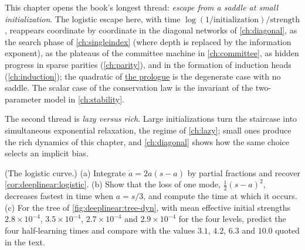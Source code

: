 \begin{refsection}

This chapter opens the book's longest thread: \emph{escape from a saddle at small initialization}. The logistic escape here, with time $\log(1/\text{initialization})/\text{strength}$, reappears coordinate by coordinate in the diagonal networks of \cref{ch:diagonal}, as the search phase of \cref{ch:singleindex} (where depth is replaced by the information exponent), as the plateaus of the committee machine in \cref{ch:committee}, as hidden progress in sparse parities (\cref{ch:parity}), and in the formation of induction heads (\cref{ch:induction}); the quadratic of \hyperref[ch:prologue]{the prologue} is the degenerate case with no saddle. The scalar case of the conservation law is the invariant of the two-parameter model in \cref{ch:stability}.

The second thread is \emph{lazy versus rich}. Large initializations turn the staircase into simultaneous exponential relaxation, the regime of \cref{ch:lazy}; small ones produce the rich dynamics of this chapter, and \cref{ch:diagonal} shows how the same choice selects an implicit bias.

\begin{exercises}
\item \consolidation (The logistic curve.) (a) Integrate $\dot a=2a(s-a)$ by partial fractions and recover \cref{cor:deeplinear:logistic}. (b) Show that the loss of one mode, $\frac12(s-a)^2$, decreases fastest in time when $a=s/3$, and compute the time at which it occurs. (c) For the tree of \cref{fig:deeplinear:tree-dyn}, with mean effective initial strengths $2.8\times10^{-4}$, $3.5\times10^{-4}$, $2.7\times10^{-4}$ and $2.9\times10^{-4}$ for the four levels, predict the four half-learning times and compare with the values $3.1$, $4.2$, $6.3$ and $10.0$ quoted in the text.\label{ex:deeplinear:logistic}


\end{exercises}
\end{refsection}
